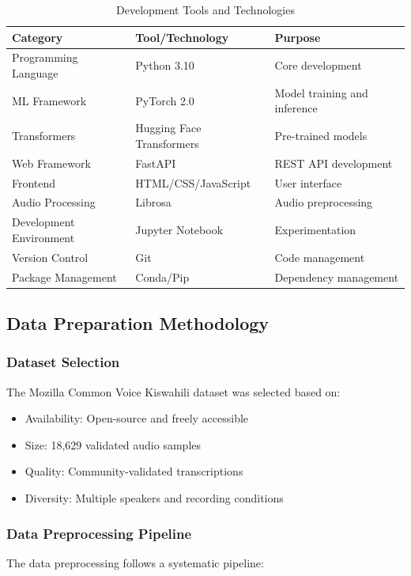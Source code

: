 \documentclass[12pt,a4paper]{report}
\begin{document}
\begin{table}[H]
\centering
\caption{Development Tools and Technologies}
\label{tab:dev_tools}
\begin{tabular}{@{}llp{5cm}@{}}
\toprule
\textbf{Category} & \textbf{Tool/Technology} & \textbf{Purpose} \\ \midrule
Programming Language & Python 3.10 & Core development \\
ML Framework & PyTorch 2.0 & Model training and inference \\
Transformers & Hugging Face Transformers & Pre-trained models \\
Web Framework & FastAPI & REST API development \\
Frontend & HTML/CSS/JavaScript & User interface \\
Audio Processing & Librosa & Audio preprocessing \\
Development Environment & Jupyter Notebook & Experimentation \\
Version Control & Git & Code management \\
Package Management & Conda/Pip & Dependency management \\ \bottomrule
\end{tabular}
\end{table}

\subsection{Data Preparation Methodology}
\subsubsection{Dataset Selection}
The Mozilla Common Voice Kiswahili dataset was selected based on:

\begin{itemize}
    \item Availability: Open-source and freely accessible
    \item Size: 18,629 validated audio samples
    \item Quality: Community-validated transcriptions
    \item Diversity: Multiple speakers and recording conditions
\end{itemize}

\subsubsection{Data Preprocessing Pipeline}
The data preprocessing follows a systematic pipeline:
\end{document}
